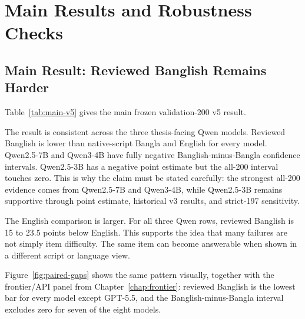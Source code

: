 \chapter{Main Results and Robustness Checks}

\section{Main Result: Reviewed Banglish Remains Harder}

Table~\ref{tab:main-v5} gives the main frozen validation-200 v5 result.

\begin{table}[H]
\centering
\caption{Main validation-200 v5 results}
\label{tab:main-v5}
\small
{}
\end{table}

The result is consistent across the three thesis-facing Qwen models. Reviewed Banglish is lower than native-script Bangla and English for every model. Qwen2.5-7B and Qwen3-4B have fully negative Banglish-minus-Bangla confidence intervals. Qwen2.5-3B has a negative point estimate but the all-200 interval touches zero. This is why the claim must be stated carefully: the strongest all-200 evidence comes from Qwen2.5-7B and Qwen3-4B, while Qwen2.5-3B remains supportive through point estimate, historical v3 results, and strict-197 sensitivity.

The English comparison is larger. For all three Qwen rows, reviewed Banglish is 15 to 23.5 points below English. This supports the idea that many failures are not simply item difficulty. The same item can become answerable when shown in a different script or language view.

Figure~\ref{fig:paired-gaps} shows the same pattern visually, together with the frontier/API panel from Chapter~\ref{chap:frontier}: reviewed Banglish is the lowest bar for every model except GPT-5.5, and the Banglish-minus-Bangla interval excludes zero for seven of the eight models.

